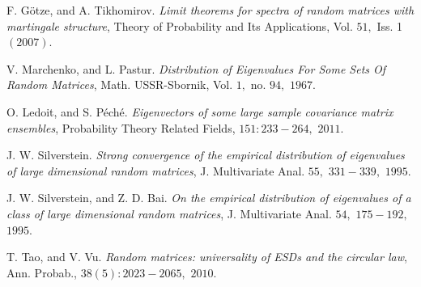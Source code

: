 \documentclass{article}
\numberwithin{equation}{section}
\begin{document}
\begin{thebibliography}{}
     F. Götze, and A. Tikhomirov. \textit{Limit theorems for spectra of random matrices with martingale structure}, Theory of Probability and Its Applications, Vol. \(51,\) Iss. 1 \((2007).\)
    
    V. Marchenko, and L. Pastur. \textit{Distribution of Eigenvalues For Some Sets Of Random Matrices}, Math. USSR-Sbornik, Vol. \(1,\) no. \(94,\) \(1967.\)

     O. Ledoit, and S. Péché. \textit{Eigenvectors of some large sample covariance matrix ensembles}, Probability Theory Related Fields, \(151:233-264,\) \(2011.\)

     J. W. Silverstein. \textit{Strong convergence of the empirical distribution of eigenvalues of large dimensional random matrices}, J. Multivariate Anal. \(55,\) \(331-339,\) \(1995.\)

     J. W. Silverstein, and Z. D. Bai. \textit{On the empirical distribution of eigenvalues of a class of large dimensional random matrices}, J. Multivariate Anal. \(54,\) \(175-192,\) \(1995.\)

     T. Tao, and V. Vu. \textit{Random matrices: universality of ESDs and the circular law}, Ann. Probab., \(38(5):2023-2065,\) \(2010.\)
    
\end{thebibliography}
\end{document}

